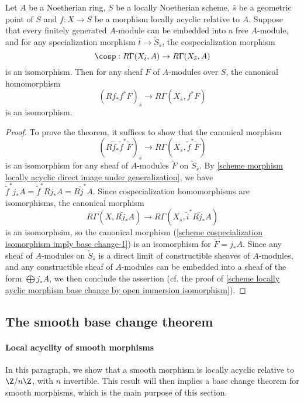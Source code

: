 \begin{theorem}\label{scheme cospecialization isomorphism imply base change}
Let $A$ be a Noetherian ring, $S$ be a locally Noetherian scheme, $\bar{s}$ be a geometric point of $S$ and $f:X\to S$ be a morphism locally acyclic relative to $A$. Suppose that every finitely generated $A$-module can be embedded into a free $A$-module, and for any specialization morphism $\bar{t}\to\widetilde{S}_{\bar{s}}$, the cospecialization morphism
\[\cosp:R\Gamma(X_{\bar{t}},A)\to R\Gamma(X_{\bar{s}},A)\]
is an isomorphism. Then for any sheaf $F$ of $A$-modules over $S$, the canonical homomorphism
\[(Rf_*f^*F)_{\bar{s}}\to R\Gamma(X_{\bar{s}},f^*F)\]
is an isomorphism.
\end{theorem}
\begin{proof}
To prove the theorem, it suffices to show that the canonical morphism
\begin{equation}\label{scheme cospecialization isomorphism imply base change-1}
(R\tilde{f}_*\tilde{f}^*\widetilde{F})_{\bar{s}}\to R\Gamma(X_{\bar{s}},\tilde{f}^*\widetilde{F})
\end{equation}
is an isomorphism for any sheaf of $A$-modules $\widetilde{F}$ on $\widetilde{S}_{\bar{s}}$. By \cref{scheme morphism locally acyclic direct image under generalization}, we have $\tilde{f}^*j_*A=\tilde{f}^*Rj_*A=R\tilde{j}^*A$. Since cospecialization homomorphisms are isomorphisms, the canonical morphism
\[R\Gamma(X,R\tilde{j}_*A)\to R\Gamma(X_{\bar{s}},\tilde{i}^*R\tilde{j}_*A)\]
is an isomorphsim, so the canonical morphism (\ref{scheme cospecialization isomorphism imply base change-1}) is an isomorphism for $\widetilde{F}=j_*A$. Since any sheaf of $A$-modules on $\widetilde{S}_{\bar{s}}$ is a direct limit of constructible sheaves of $A$-modules, and any constructible sheaf of $A$-modules can be embedded into a sheaf of the form $\bigoplus j_*A$, we then conclude the assertion (cf. the proof of \cref{scheme locally ayclic morphism base change by open immersion isomorphism}).
\end{proof}

\subsection{The smooth base change theorem}
\paragraph{Local acyclity of smooth morphisms} In this paragraph, we show that a smooth morphism is locally acyclic relative to $\Z/n\Z$, with $n$ invertible. This result will then implies a base change theorem for smooth morphisms, which is the main purpose of this section. 

